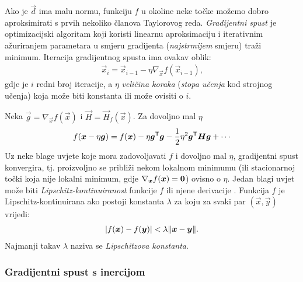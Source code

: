 \documentclass[utf8, diplomski, lmodern]{fer}
\begin{document}
Ako je $\vec d$ ima malu normu, funkciju $f$ u okoline neke točke možemo dobro aproksimirati s prvih nekoliko članova Taylorovog reda. \emph{Gradijentni spust} je optimizacijski algoritam koji koristi linearnu aproksimaciju i iterativnim ažuriranjem parametara u smjeru gradijenta (\textit{najstrmijem} smjeru) traži minimum. Iteracija gradijentnog spusta ima ovakav oblik:
\begin{align} \label{eq:gs}
\vec x_i = \vec x_{i-1} - \eta\nabla_{\vec x}f(\vec x_{i-1}) \text{,}
\end{align}
gdje je $i$ redni broj iteracije, a $\eta$ \emph{veličina koraka} (\emph{stopa učenja} kod strojnog učenja) koja može biti konstanta ili može ovisiti o $i$.

Neka $\vec g=\nabla_{\vec x}f(\vec x)$ i $\vec H=\vec H_f(\vec x)$. Za dovoljno mal $\eta$
\begin{align} \label{eq:grad-delta-approx}
f(\vec x-\eta\vec g) = f(\vec x) - \eta\vec g^\tp\vec g - \frac{1}{2}\eta^2\vec g^\tp\vec H\vec g + \cdots
\end{align}
Uz neke blage uvjete koje mora zadovoljavati $f$ i dovoljno mal $\eta$, gradijentni spust konvergira, tj. proizvoljno se približi nekom lokalnom minimumu (ili stacionarnoj točki koja nije lokalni minimum, gdje $\nabla_{\vec x}f(\vec x)=\cvec 0$) ovisno o $\eta$. Jedan blagi uvjet može biti \emph{Lipschitz-kontinuiranost} funkcije $f$ ili njene derivacije \citep{Goodfellow:2016:DL}. Funkcija $f$ je Lipschitz-kontinuirana ako postoji konstanta $\lambda$ za koju za svaki par $(\vec x,\vec y)$ vrijedi:
\begin{align}
\envert{f(\vec x)-f(\vec y)} < \lambda\enVert{\vec x-\vec y} \text{.}
\end{align}
Najmanji takav $\lambda$ naziva se \emph{Lipschitzova konstanta}.

\subsubsection{Gradijentni spust s inercijom}
\end{document}
